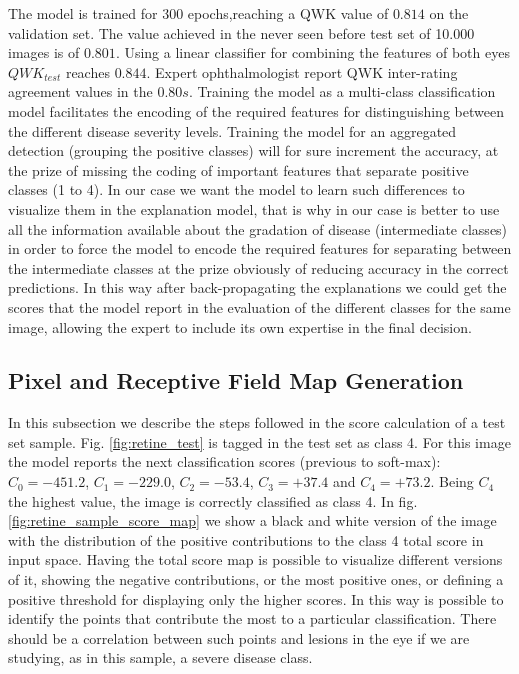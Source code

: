 \documentclass[review]{elsarticle}
\theoremstyle{definition} %
\theoremstyle{remark}
\begin{document}
The model is trained for 300 epochs,reaching a QWK value of $0.814$ on the validation set. The value achieved in the never seen before test set of 10.000 images is of $0.801$. Using a linear classifier for combining the features of both eyes $QWK_{test}$ reaches $0.844$. Expert ophthalmologist report QWK inter-rating agreement values in the $0.80s$. Training the model as a multi-class classification model facilitates the encoding of the required features for distinguishing between the different disease severity levels. Training the model for an aggregated detection (grouping the positive classes) will for sure increment the accuracy, at the prize of missing the coding of important features that separate positive classes (1 to 4). In our case we want the model to learn such differences to visualize them in the explanation model, that is why in our case is better to use all the information available about the gradation of disease (intermediate classes) in order to force the model to encode the required features for separating between the intermediate classes at the prize obviously of reducing accuracy in the correct predictions. In this way after back-propagating the explanations we could get the scores that the model report in the evaluation of the different classes for the same image, allowing the expert to include its own expertise in the final decision.

\subsection{Pixel and Receptive Field Map Generation}

In this subsection we describe the steps followed in the score calculation of a test set sample. Fig. \ref{fig:retine_test} is tagged in the test set as class 4. For this image the model reports the next classification scores (previous to soft-max): $C_0 = -451.2$, $C_1 = -229.0$, $C_2 = -53.4$, $C_3 = +37.4$ and $C_4 = +73.2$. Being $C_4$ the highest value, the image is correctly classified as class 4. In fig. \ref{fig:retine_sample_score_map} we show a black and white version of the image with the distribution of the positive contributions to the class 4 total score in input space. Having the total score map is possible to visualize different versions of it, showing the negative contributions, or the most positive ones, or defining a positive threshold for displaying only the higher scores. In this way is possible to identify the points that contribute the most to a particular classification. There should be a correlation between such points and lesions in the eye if we are studying, as in this sample, a severe disease class.
\end{document}
